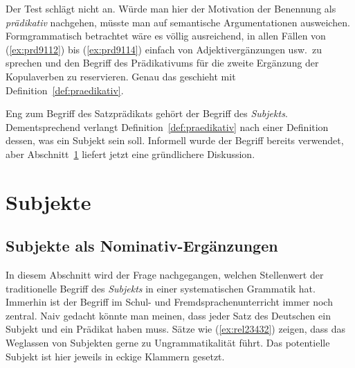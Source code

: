 Der Test schlägt nicht an.
Würde man hier der Motivation der Benennung als \textit{prädikativ} nachgehen, müsste man auf semantische Argumentationen ausweichen.
Formgrammatisch betrachtet wäre es völlig ausreichend, in allen Fällen von (\ref{ex:prd9112}) bis (\ref{ex:prd9114}) einfach von Adjektivergänzungen usw.\ zu sprechen und den Begriff des Prädikativums für die zweite Ergänzung der Kopulaverben zu reservieren.
Genau das geschieht mit Definition~\ref{def:praedikativ}.


Eng zum Begriff des Satzprädikats gehört der Begriff des \textit{Subjekts}.
Dementsprechend verlangt Definition~\ref{def:praedikativ} nach einer Definition dessen, was ein Subjekt sein soll.
Informell wurde der Begriff bereits verwendet, aber Abschnitt~\ref{sec:subjekt} liefert jetzt eine gründlichere Diskussion.

\Stretch[0.6]


\Stretch

\section{Subjekte}

\label{sec:subjekt}

\subsection{Subjekte als Nominativ-Ergänzungen}


In diesem Abschnitt wird der Frage nachgegangen, welchen Stellenwert der traditionelle Begriff des \textit{Subjekts} in einer systematischen Grammatik hat.
Immerhin ist der Begriff im Schul- und Fremdsprachenunterricht immer noch zentral.
Naiv gedacht könnte man meinen, dass jeder Satz des Deutschen ein Subjekt und ein Prädikat haben muss.
Sätze wie (\ref{ex:rel23432}) zeigen, dass das Weglassen von Subjekten gerne zu Ungrammatikalität führt.
Das potentielle Subjekt ist hier jeweils in eckige Klammern gesetzt.


